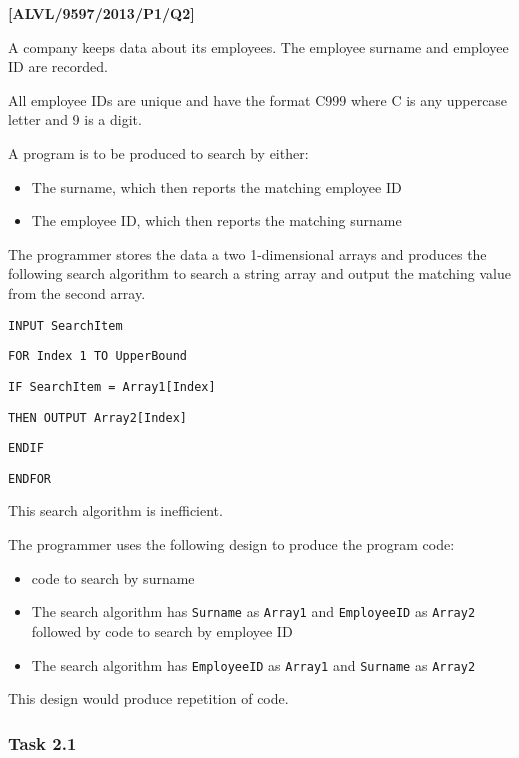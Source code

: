 \quad{}
\item \textbf{{[}ALVL/9597/2013/P1/Q2{]} }

A company keeps data about its employees. The employee surname and
employee ID are recorded. 

All employee IDs are unique and have the format C999 where C is any
uppercase letter and 9 is a digit.

A program is to be produced to search by either:
\begin{itemize}
\item The surname, which then reports the matching employee ID
\item The employee ID, which then reports the matching surname
\end{itemize}
The programmer stores the data a two 1-dimensional arrays and produces
the following search algorithm to search a string array and output
the matching value from the second array.

\noindent %
\noindent\begin{minipage}[t]{1\columnwidth}%
\texttt{INPUT SearchItem }

\texttt{FOR Index \textleftarrow{} 1 TO UpperBound }

\texttt{\qquad{}IF SearchItem = Array1{[}Index{]} }

\texttt{\qquad{}\qquad{}THEN OUTPUT Array2{[}Index{]} }

\texttt{\qquad{}ENDIF }

\texttt{ENDFOR}%
\end{minipage}

This search algorithm is inefficient.

The programmer uses the following design to produce the program code:
\begin{itemize}
\item code to search by surname 
\item The search algorithm has \texttt{Surname} as \texttt{Array1} and \texttt{EmployeeID}
as \texttt{Array2} followed by code to search by employee ID 
\item The search algorithm has \texttt{EmployeeID} as \texttt{Array1} and
\texttt{Surname} as \texttt{Array2}
\end{itemize}
This design would produce repetition of code.

\subsubsection*{Task 2.1}


